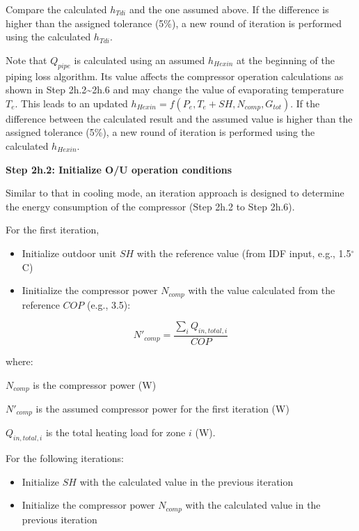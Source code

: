 Compare the calculated \(h_{Tdi}\) and the one assumed above. If the difference is higher than the assigned tolerance (5\%), a new round of iteration is performed using the calculated \(h_{Tdi}\).

Note that \(Q_{pipe}\) is calculated using an assumed \(h_{Hexin}\) at the beginning of the piping loss algorithm. Its value affects the compressor operation calculations as shown in Step 2h.2\textasciitilde{}2h.6 and may change the value of evaporating temperature \(T_e\). This leads to an updated \(h_{Hexin} = f(P_e,T_e+SH,N_{comp},G_{tot})\). If the difference between the calculated result and the assumed value is higher than the assigned tolerance (5\%), a new round of iteration is performed using the calculated \(h_{Hexin}\).

\textbf{Step 2h.2: Initialize O/U operation conditions}

Similar to that in cooling mode, an iteration approach is designed to determine the energy consumption of the compressor (Step 2h.2 to Step 2h.6).

For the first iteration,

\begin{itemize}
\item
  Initialize outdoor unit \(SH\) with the reference value (from IDF input, e.g., 1.5\(^{\circ}\)C)
\item
  Iinitialize the compressor power \(N_{comp}\) with the value calculated from the reference \(COP\) (e.g., 3.5):
\end{itemize}

\begin{equation}
N'_{comp} = \frac{\sum_iQ_{in,total,i}}{COP}
\end{equation}

where:

\(N_{comp}\) is the compressor power (W)

\(N'_{comp}\) is the assumed compressor power for the first iteration (W)

\(Q_{in,total,i}\) is the total heating load for zone \(i\) (W).

For the following iterations:

\begin{itemize}
\item
  Initialize \(SH\) with the calculated value in the previous iteration
\item
  Initialize the compressor power \(N_{comp}\) with the calculated value in the previous iteration
\end{itemize}

